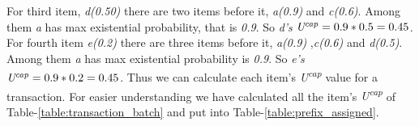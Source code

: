     For third item, \emph{d(0.50)} there are two items before it, \emph{a(0.9)} and \emph{c(0.6)}. Among them \emph{a} has max existential probability, that is \emph{0.9}. So \emph{d's } $\emph{U\textsuperscript{cap}} = 0.9*0.5 = 0.45$.\\
    For fourth item \emph{e(0.2)} there are three items before it, \emph{a(0.9)} ,\emph{c(0.6)} and \emph{d(0.5)}. Among them \emph{a} has max existential probability is \emph{0.9}. So \emph{e's}  $\emph{U\textsuperscript{cap}} = 0.9*0.2 = 0.45$. Thus we can calculate each item's \emph{U\textsuperscript{cap}} value for a transaction. For easier understanding we have calculated all the item's \emph{U\textsuperscript{cap}} of Table-\ref{table:transaction_batch} and put into Table-\ref{table:prefix_assigned}.
    
    
    
